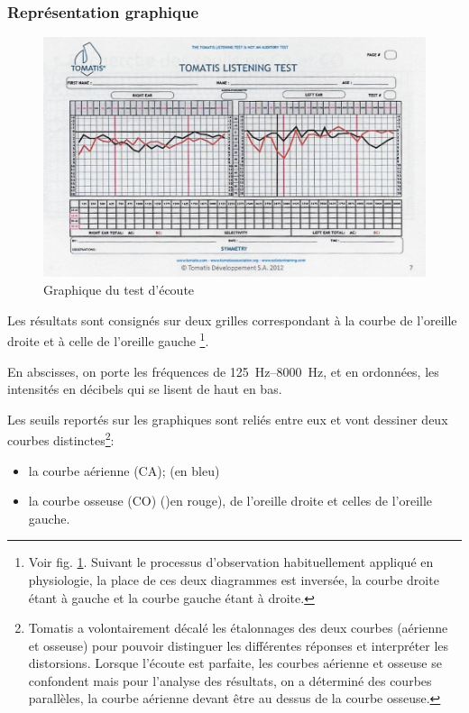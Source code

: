 \subsubsection{Représentation graphique}

\begin{figure}
	\centering
	\includegraphics[width=0.7\linewidth]{images/tomatisListeningTest.jpg}
	\caption[Graphique du test d'écoute]{Graphique du test d'écoute}
	\label{fig:tomatislisteningtest}
\end{figure}

Les résultats sont consignés sur deux grilles correspondant à la courbe
de l'oreille droite et à celle de l'oreille gauche%
\footnote{Voir fig. \ref{fig:tomatislisteningtest}. Suivant le processus d'observation habituellement appliqué en physiologie,
la place de ces deux diagrammes est inversée, la courbe droite étant
à gauche et la courbe gauche étant à droite.}.

En abscisses, on porte les fréquences de \SIrange{125}{8000}{\Hz}, et en ordonnées,
les intensités en décibels qui se lisent de haut en bas. 

Les seuils reportés sur les graphiques sont reliés entre eux et vont
dessiner deux courbes distinctes\footnote{Tomatis a volontairement décalé les étalonnages des deux courbes (aérienne
	et osseuse) pour pouvoir distinguer les différentes réponses et interpréter
	les distorsions. Lorsque l'écoute est parfaite, les
	courbes aérienne et osseuse se confondent mais pour l'analyse des
	résultats, on a déterminé des courbes parallèles, la courbe aérienne
	devant être au dessus de la courbe osseuse.}: 
\begin{itemize}
	\item la courbe aérienne (CA); (en bleu)
	\item la courbe osseuse (CO) ()en rouge), de l'oreille droite et celles de l'oreille gauche.
\end{itemize}



